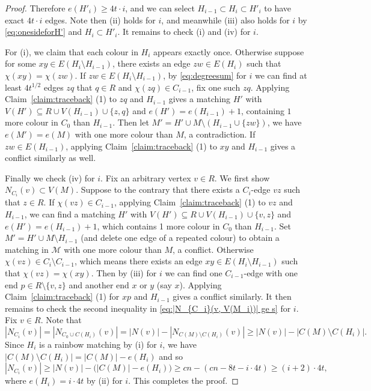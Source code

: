 \documentclass[11pt,reqno]{amsart}
\theoremstyle{definition}
\theoremstyle{remark}
\newcommand\cM{\mathcal{M}}
\renewcommand\geq{\geqslant}
\begin{document}
\begin{proof}
Therefore $e(H'_i)\geq 4t\cdot i$, and we can select $H_{i-1}\subset H_i\subset H'_i$ to have exact $4t\cdot i$ edges. Note then (ii) holds for $i$, and meanwhile (iii) also holds for $i$ by \eqref{eq:onesideforH'} and $H_i\subset H'_i$. It remains to check (i) and (iv) for $i$.

For (i), we claim that each colour in $H_i$ appears exactly once. Otherwise suppose for some $xy\in E(H_i\setminus H_{i-1})$, there exists an edge $zw\in E(H_i)$ such that $\chi(xy)=\chi(zw)$. If $zw\in E(H_i\setminus H_{i-1})$, by \eqref{eq:degreesum} for $i$ we can find at least $4t^{1/2}$ edges $zq$ that $q\in R$ and $\chi(zq)\in C_{i-1}$, fix one such $zq$. Applying Claim~\ref{claim:traceback} (1) to $zq$ and $H_{i-1}$ gives a matching $H'$ with $V(H') \subseteq R \cup V(H_{i-1}) \cup \{z,q\}$ and $e(H')=e(H_{i-1})+1$, containing $1$ more colour in $C_0$ than $H_{i-1}$. Then let $M'=H'\cup M\setminus (H_{i-1}\cup\{zw\})$, we have
$e(M')=e(M)$ with one more colour than $M$, a contradiction. If $zw\in E(H_{i-1})$, applying Claim~\ref{claim:traceback} (1) to $xy$ and $H_{i-1}$ gives a conflict similarly as well.


Finally we check (iv) for $i$. Fix an arbitrary vertex $v \in R$. We first show $N_{C_i}(v) \subset V(M).$  Suppose to the contrary that there exists a $C_i$-edge $vz$ such that $z\in R$. If $\chi(vz)\in C_{i-1}$, applying Claim~\ref{claim:traceback} (1) to $vz$ and $H_{i-1}$, we can find a matching $H'$ with $V(H') \subseteq R \cup V(H_{i-1}) \cup \{v,z\}$ and $e(H')=e(H_{i-1})+1$, which contains 1 more colour in $C_0$ than $H_{i-1}$. Set $M'= H'\cup M\setminus H_{i-1}$ (and delete one edge of a repeated colour) to obtain a matching in $\cM$ with one more colour than $M$, a conflict. Otherwise $\chi(vz)\in C_i\setminus C_{i-1}$, which means there exists an edge $xy\in E(H_i\setminus H_{i-1})$ such that $\chi(vz)=\chi(xy)$. Then by (iii) for $i$ we can find one $C_{i-1}$-edge with one end $p\in R\setminus\{v,z\}$ and another end $x$ or $y$ (say $x$). Applying Claim~\ref{claim:traceback} (1) for $xp$ and $H_{i-1}$ gives a conflict similarly. It then remains to check the second inequality in \eqref{eq:|N_{C_i}(v, V(M_i))| ge s} for $i$.
Fix $v\in R$. Note that
$$|N_{C_i}(v)| =|N_{C_0\cup C(H_i)}(v)|
= |N(v)| - |N_{C(M)\setminus C(H_i)}(v)|
\geq |N(v)| - |C(M)\setminus C(H_i)|.$$
Since $H_i$ is a rainbow matching by (i) for $i$, we have $|C(M)\setminus C(H_i)|=|C(M)|-e(H_i)$ and so
$$|N_{C_i}(v)|\geq |N(v)|- \big(|C(M)|-e(H_i)\big)\geq cn - (cn-8t - i\cdot 4t)\geq (i+2)\cdot 4t,$$
where $e(H_i)=i\cdot 4t$ by (ii) for $i$. This completes the proof.
\end{proof}
\end{document}
